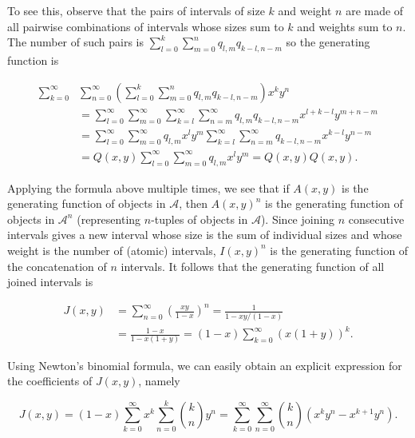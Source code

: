 \documentclass{article}
\begin{document}
To see this, observe that the pairs of intervals of size $k$ and weight
$n$ are made of all pairwise combinations of intervals whose sizes sum to
$k$ and weights sum to $n$. The number of such pairs is $\sum_{l=0}^k
\sum_{m=0}^n q_{l,m}q_{k-l,n-m}$ so the generating function is

\begin{equation*}
\begin{split}
\sum_{k=0}^\infty &\sum_{n=0}^\infty \left( \sum_{l=0}^k \sum_{m=0}^n
  q_{l,m}q_{k-l,n-m}\right) x^k y^n \\
&= \sum_{l=0}^\infty \sum_{m=0}^\infty \sum_{k=l}^\infty \sum_{n=m}^\infty
  q_{l,m}q_{k-l,n-m}x^{l + k-l} y^{m + n-m} \\ 
&= \sum_{l=0}^\infty \sum_{m=0}^\infty q_{l,m} x^l y^m
  \sum_{k=l}^\infty \sum_{n=m}^\infty
  q_{k-l,n-m}x^{k-l} y^{n-m} \\
&= Q(x,y) \sum_{l=0}^\infty \sum_{m=0}^\infty q_{l,m} x^l y^m
 = Q(x,y)Q(x,y).
\end{split}
\end{equation*}


Applying the formula above multiple times, we see that if $A(x,y)$ is the
generating function of objects in $\mathcal{A}$, then $A(x,y)^n$ is the
generating function of objects in $\mathcal{A}^n$ (representing $n$-tuples
of objects in $\mathcal{A}$). Since joining $n$ consecutive intervals
gives a new interval whose size is the sum of individual sizes and whose
weight is the number of (atomic) intervals, $I(x,y)^n$ is the generating
function of the concatenation of $n$ intervals. It follows that the
generating function of all joined intervals is

\begin{equation}
\begin{split}
\label{eq:J}
J(x,y) &= \sum_{n=0}^\infty \left( \frac{xy}{1-x} \right)^n
= \frac{1}{1 - xy/(1-x)} \\
&= \frac{1-x}{1-x(1+y)} = (1-x) \sum_{k=0}^\infty \left(x(1+y) \right)^k.
\end{split}
\end{equation}

Using Newton's binomial formula, we can easily obtain an explicit
expression for the coefficients of $J(x,y)$, namely

\begin{equation*}
J(x,y) = (1-x)\sum_{k=0}^\infty x^k\sum_{n=0}^k {k \choose n} y^n
= \sum_{k=0}^\infty\sum_{n=0}^\infty{k \choose n} (x^ky^n - x^{k+1}y^n).
\end{equation*}
\end{document}
